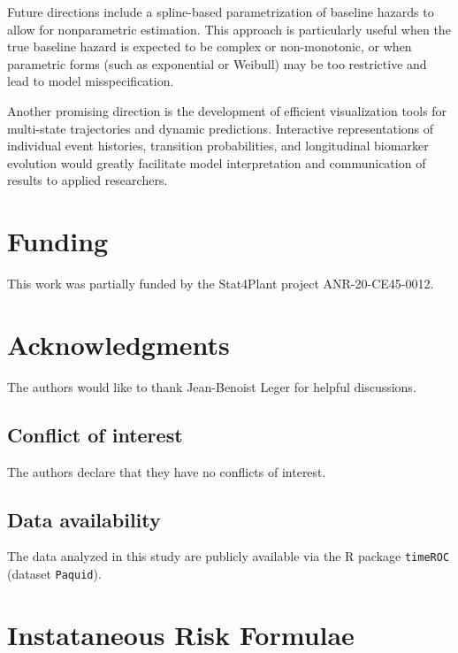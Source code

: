 \documentclass{sn-jnl}
\begin{document}
Future directions include a spline-based parametrization of baseline hazards to allow for nonparametric estimation. This approach is particularly useful when the true baseline hazard is expected to be complex or non-monotonic, or when parametric forms (such as exponential or Weibull) may be too restrictive and lead to model misspecification.

Another promising direction is the development of efficient visualization tools for multi-state trajectories and dynamic predictions. Interactive representations of individual event histories, transition probabilities, and longitudinal biomarker evolution would greatly facilitate model interpretation and communication of results to applied researchers.

\section*{Funding}

This work was partially funded by the Stat4Plant project
ANR-20-CE45-0012.

\section*{Acknowledgments}

The authors would like to thank Jean-Benoist Leger for helpful
discussions.

\subsection*{Conflict of interest}
The authors declare that they have no conflicts of interest.

\subsection*{Data availability}
The data analyzed in this study are publicly available via the R package \texttt{timeROC} (dataset \texttt{Paquid}).

\newpage




\appendix

\newpage

\section{Instataneous Risk Formulae} \label{sec:proof-risk}
\end{document}
